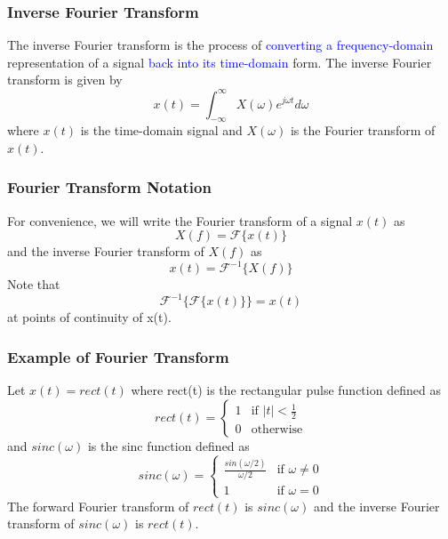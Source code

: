 \documentclass{beamer}
\begin{document}
\begin{frame}
    \frametitle{Inverse Fourier Transform}
    The inverse Fourier transform is the process of \textcolor{blue}{converting a frequency-domain} representation of a signal \textcolor{blue}{back into its time-domain} form.
    The inverse Fourier transform is given by
    \begin{equation*}
        x(t) = \int_{-\infty}^{\infty} X(\omega) e^{j\omega t} d\omega
    \end{equation*}
    where $x(t)$ is the time-domain signal and $X(\omega)$ is the Fourier transform of $x(t)$.
\end{frame}

\begin{frame}
    \frametitle{Fourier Transform Notation}
    For convenience, we will write the Fourier transform of a signal $x(t)$ as
    \begin{equation*}
        X(f) = \mathcal{F}\{x(t)\}
    \end{equation*}
    and the inverse Fourier transform of $X(f)$ as
    \begin{equation*}
        x(t) = \mathcal{F}^{-1}\{X(f)\}
    \end{equation*}
    Note that
    \begin{equation*}
        \mathcal{F}^{-1}\{\mathcal{F}\{x(t)\}\} = x(t)
    \end{equation*}
    at points of continuity of x(t).
\end{frame}

\begin{frame}
    \frametitle{Example of Fourier Transform}
    Let $x(t) = rect(t)$ where rect(t) is the rectangular pulse function defined as
    \begin{equation*}
        rect(t) = \begin{cases}
            1 & \text{if } |t| < \frac{1}{2}\\
            0 & \text{otherwise}
        \end{cases}
    \end{equation*}
    and $sinc(\omega)$ is the sinc function defined as
    \begin{equation*}
        sinc(\omega) = \begin{cases}
            \frac{sin(\omega / 2)}{\omega / 2} & \text{if } \omega \neq 0\\
            1 & \text{if } \omega = 0
        \end{cases}
    \end{equation*}
    The forward Fourier transform of $rect(t)$ is $sinc(\omega)$ and the inverse Fourier transform of $sinc(\omega)$ is $rect(t)$.
\end{frame}
\end{document}
